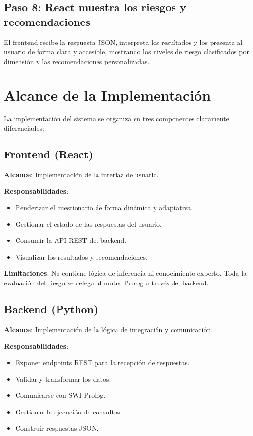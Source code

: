 \documentclass[12pt, letterpaper]{article}
\begin{document}
\subsection{Paso 8: React muestra los riesgos y recomendaciones}

El frontend recibe la respuesta JSON, interpreta los resultados y los presenta al usuario de forma clara y accesible, mostrando los niveles de riesgo clasificados por dimensión y las recomendaciones personalizadas.

\section{Alcance de la Implementación}

La implementación del sistema se organiza en tres componentes claramente diferenciados:

\subsection{Frontend (React)}

\textbf{Alcance}: Implementación de la interfaz de usuario.

\textbf{Responsabilidades}:
\begin{itemize}
  \item Renderizar el cuestionario de forma dinámica y adaptativa.
  \item Gestionar el estado de las respuestas del usuario.
  \item Consumir la API REST del backend.
  \item Visualizar los resultados y recomendaciones.
\end{itemize}

\textbf{Limitaciones}: No contiene lógica de inferencia ni conocimiento experto. Toda la evaluación del riesgo se delega al motor Prolog a través del backend.

\subsection{Backend (Python)}

\textbf{Alcance}: Implementación de la lógica de integración y comunicación.

\textbf{Responsabilidades}:
\begin{itemize}
  \item Exponer endpoints REST para la recepción de respuestas.
  \item Validar y transformar los datos.
  \item Comunicarse con SWI-Prolog.
  \item Gestionar la ejecución de consultas.
  \item Construir respuestas JSON.
\end{itemize}
\end{document}
